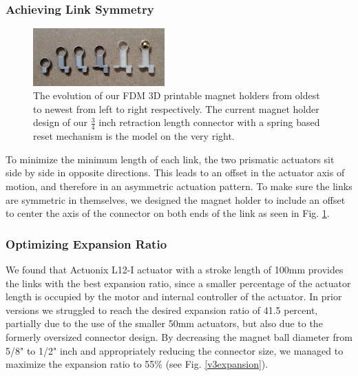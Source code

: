 \documentclass[letterpaper, 10 pt, conference]{ieeeconf}  %
\begin{document}
\subsubsection{Achieving Link Symmetry}
\begin{figure}
\centering
\includegraphics[width=0.45\textwidth]{media/MagnetHolder_Evolution.jpg}
   \caption{\label{MagnetHolderEvolution} The evolution of our FDM 3D printable magnet holders from oldest to newest from left to right respectively. The current magnet holder design of our $\frac{3}{4}$ inch retraction length connector with a spring based reset mechanism is the model on the very right.}
\end{figure}

To minimize the minimum length of each link, the two prismatic actuators sit side by side in opposite directions. This leads to an offset in the actuator axis of motion, and therefore in an asymmetric actuation pattern. To make sure the links are symmetric in themselves, we designed the magnet holder to include an offset to center the axis of the connector on both ends of the link as seen in Fig. \ref{MagnetHolderEvolution}.

\subsubsection{Optimizing Expansion Ratio}
We found that Actuonix L12-I actuator with a stroke length of 100mm provides the links with the best expansion ratio, since a smaller percentage of the actuator length is occupied by the motor and internal controller of the actuator. In prior versions we struggled to reach the desired expansion ratio of 41.5 percent, partially due to the use of the smaller 50mm actuators, but also due to the formerly oversized connector design. By decreasing the magnet ball diameter from 5/8" to 1/2" inch and appropriately reducing the connector size, we managed to maximize the expansion ratio to 55\% (see Fig. \ref{v3expansion}).
\end{document}
